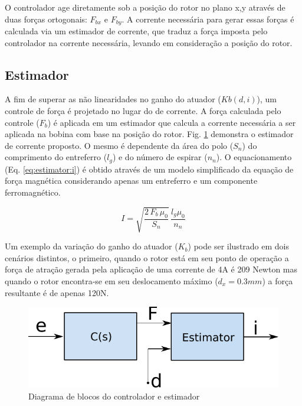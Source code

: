 O controlador age diretamente sob a posição do rotor no plano x,y através de duas forças ortogonais: $F_{bx}$ e $F_{by}$. A corrente necessária para gerar essas forças é calculada via um estimador de corrente, que traduz a força imposta pelo controlador na corrente necessária, levando em consideração a posição do rotor.


\subsection{Estimador}
	
A fim de superar as não linearidades no ganho do atuador ($Kb(d,i)$), um controle de força é projetado no lugar do de corrente. A força calculada pelo controle ($F_b$) é aplicada em um estimador que calcula a corrente necessária a ser aplicada na bobina com base na posição do rotor. Fig. \ref{fig:diagrama_controlador_estimador} demonstra o estimador de corrente proposto. O mesmo é dependente da área do polo ($S_n$) do comprimento do entreferro ($l_g$) e do número de espirar ($n_n$). O equacionamento (Eq. \eqref{eq:estimator:i}) é obtido através de um modelo simplificado da equação de força magnética considerando apenas um entreferro e um componente ferromagnético.

	
\begin{equation}
I = \sqrt{\frac{2 \, F_b \, \mu_0}{S_n}} \, \frac{l_g \mu_0}{n_n}
\label{eq:estimator:i}
\end{equation}
	
Um exemplo da variação do ganho do atuador ($K_b$) pode ser ilustrado em dois cenários distintos, o primeiro, quando o rotor está em seu ponto de operação a força de atração gerada pela aplicação de uma corrente de 4A é 209 Newton mas quando o rotor encontra-se em seu deslocamento máximo  ($d_x = 0.3 mm$) a força resultante é de apenas 120N.

\begin{figure}[ht!]
	\centering
	\includegraphics[width=0.5\linewidth]{Figs/Modelagem/controlador_estimador}
	\caption{Diagrama de blocos do controlador e estimador}
	\label{fig:diagrama_controlador_estimador}
\end{figure}


